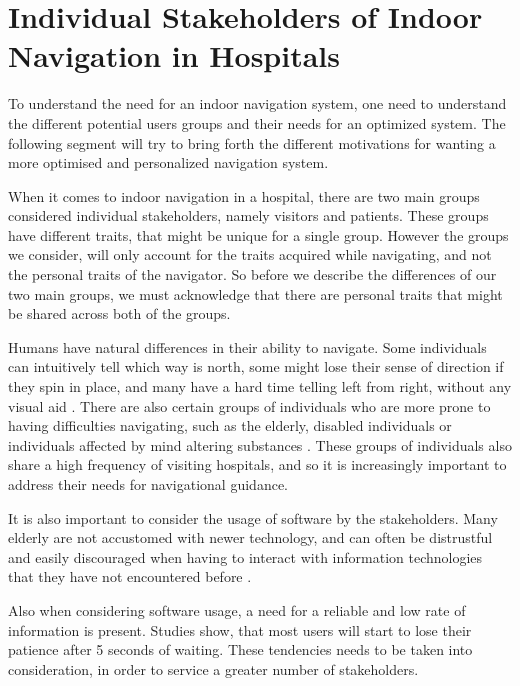 \section{Individual Stakeholders of Indoor Navigation in Hospitals} %
\label{sec:interusers}

To understand the need for an indoor navigation system, one need to understand the different potential users groups and their needs for an optimized system. The following segment will try to bring forth the different motivations for wanting a more optimised and personalized navigation system.

When it comes to indoor navigation in a hospital, there are two main groups considered individual stakeholders, namely visitors and patients. These groups have different traits, that might be unique for a single group. However the groups we consider, will only account for the traits acquired while navigating, and not the personal traits of the navigator. So before we describe the differences of our two main groups, we must acknowledge that there are personal traits that might be shared across both of the groups.

Humans have natural differences in their ability to navigate. Some individuals can intuitively tell which way is north, some might lose their sense of direction if they spin in place, and many have a hard time telling left from right, without any visual aid \cite{naturtalenter}. There are also certain groups of individuals who are more prone to having difficulties navigating, such as the elderly, disabled individuals or individuals affected by mind altering substances \cite{MCI}. These groups of individuals also share a high frequency of visiting hospitals, and so it is increasingly important to address their needs for navigational guidance.

It is also important to consider the usage of software by the stakeholders. Many elderly are not accustomed with newer technology, and can often be distrustful and easily discouraged when having to interact with information technologies that they have not encountered before \cite{gamle_teknologi}. 

Also when considering software usage, a need for a reliable and low rate of information is present. Studies show, that most users will start to lose their patience after 5 seconds of waiting\cite{ventetid}. These tendencies needs to be taken into consideration, in order to service a greater number of stakeholders.

